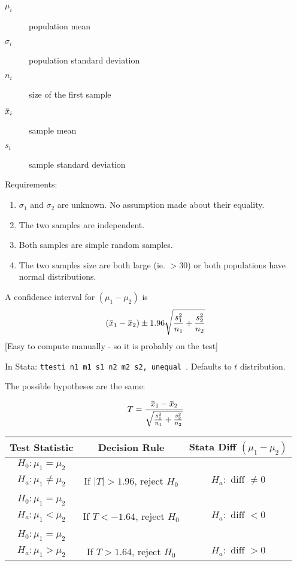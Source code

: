 \documentclass[11pt, oneside]{article}   	%
\newcommand{\overbar}[1]{\mkern 1.5mu\overline{\mkern-1.5mu#1\mkern-1.5mu}\mkern 1.5mu}
\begin{document}
 \begin{description}
 \item [$\mu_i$]population mean
 \item[$\sigma_i$]population standard deviation
 \item[$n_i$]size of the first sample
 \item[$\overbar{x}_i$]sample mean
 \item[$s_i$]sample standard deviation
 \end{description}

Requirements:
\begin{enumerate}
\item{$\sigma_1$ and $\sigma_2$ are unknown. No assumption made about their equality.}
\item{The two samples are independent.}
\item{Both samples are simple random samples.}
\item{The two samples size are both large (ie. $> 30$) or both populations have normal distributions.}
\end{enumerate}

A confidence interval for $(\mu_1 - \mu_2 )$ is
\[
(\overbar{x}_1 - \overbar{x}_2) \pm 1.96 \sqrt{ \frac{s^2_1 } {n_1 } + \frac{s^2_2 } {n_2 }     }
\]
[Easy to compute manually - so it is probably on the test]

In Stata: \texttt {ttesti n1 m1 s1 n2 m2 s2, unequal }. Defaults to $t$ distribution.

The possible hypotheses are the same:

\[
T = \frac{\overbar{x}_1 - \overbar{x}_2 }  {\sqrt{\frac{s^2_1 } {n_1 } + \frac{s^2_2 } {n_2 }  } }
\]

 \begin{tabular}{ c  c c }
Test Statistic & Decision Rule & Stata Diff $(\mu_1 - \mu_2)$ \\
\hline
$H_0 : \mu_1 = \mu_2$ \\      $H_a : \mu_1 \neq \mu_2$ & If $|T| > 1.96$, reject $H_0$ & $H_a: \text{ diff } \neq 0$\\
 & \\
$H_0 : \mu_1 = \mu_2$ \\ $H_a : \mu_1 < \mu_2$      & If $T < -1.64$, reject $H_0$ & $H_a: \text{ diff } < 0$\\
 & \\
$H_0 : \mu_1 = \mu_2$ \\ $H_a : \mu_1 > \mu_2$      & If $T > 1.64$, reject $H_0$ & $H_a: \text{ diff } > 0$\\
\end{tabular}
\end{document}
